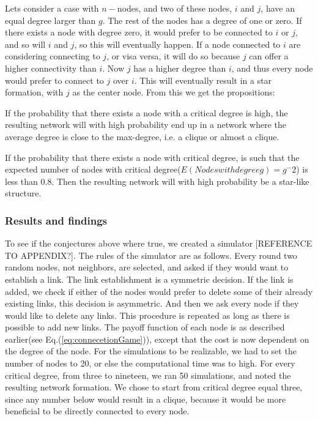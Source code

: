 Lets consider a case with $n-$nodes, and two of these nodes, $i$ and $j$, have an equal degree larger than $g$. The rest of the nodes has a degree of one or zero. If there exists a node with degree zero, it would prefer to be connected to $i$ or $j$, and so will $i$ and $j$, so this will eventually happen.
If a node connected to $i$ are considering connecting to $j$, or visa versa, it will do so because $j$ can offer a higher connectivity than $i$. Now $j$ has a higher degree than $i$, and thus every node would prefer to connect to $j$ over $i$. This will eventually result in a star formation, with $j$ as the center node.
From this we get the propositions:
\begin{cnj}
If the probability that there exists a node with a critical degree is high, the resulting network will with high probability end up in a network where the average degree is close to the max-degree, i.e. a clique or almost a clique.
\label{prop:clique}
\end{cnj}

\begin{cnj}
If the probability that there exists a node with critical degree, is such that the expected number of nodes with critical degree($E(Nodes with degree g)=g^-2$) is less than $0.8$. Then the resulting network will with high probability be a star-like structure. 
\label{prop:star}
\end{cnj} 
\subsubsection{Results and findings}

To see if the conjectures above where true, we created a simulator [REFERENCE TO APPENDIX?]. The rules of the simulator are as follows.
Every round two random nodes, not neighbors, are selected, and asked if they would want to establish a link. The link establishment is a symmetric decision. If the link is added, we check if either of the nodes would prefer to delete some of their already existing links, this decision is asymmetric. And then we ask every node if they would like to delete any links. This procedure is repeated as long as there is possible to add new links. 
The payoff function of each node is as described earlier(see Eq.(\ref{eq:connecetionGame})), except that the cost is now dependent on the degree of the node. For the simulations to be realizable, we had to set the number of nodes to 20, or else the computational time was to high. For every critical degree, from three to nineteen, we ran 50 simulations, and noted the resulting network formation. We chose to start from critical degree equal three, since any number below would result in a clique, because it would be more beneficial to be directly connected to every node.  



